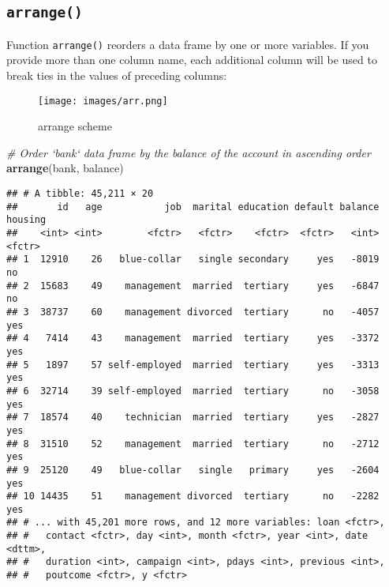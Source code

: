 \documentclass[]{book}
\newenvironment{Shaded}{\begin{snugshade}}{\end{snugshade}}
\newcommand{\KeywordTok}[1]{\textcolor[rgb]{0.13,0.29,0.53}{\textbf{{#1}}}}
\newcommand{\StringTok}[1]{\textcolor[rgb]{0.31,0.60,0.02}{{#1}}}
\newcommand{\CommentTok}[1]{\textcolor[rgb]{0.56,0.35,0.01}{\textit{{#1}}}}
\newcommand{\NormalTok}[1]{{#1}}
\begin{document}
\subsection{\texorpdfstring{\texttt{arrange()}}{arrange()}}\label{arrange}

Function \texttt{arrange()} reorders a data frame by one or more
variables. If you provide more than one column name, each additional
column will be used to break ties in the values of preceding columns:

\begin{figure}[htbp]
\centering
\texttt{[image: images/arr.png]}
\caption{arrange scheme}
\end{figure}

\begin{Shaded}
\begin{Highlighting}[]
\CommentTok{# Order `bank` data frame by the balance of the account in ascending order}
\KeywordTok{arrange}\NormalTok{(bank, balance)}
\end{Highlighting}
\end{Shaded}

\begin{verbatim}
## # A tibble: 45,211 × 20
##       id   age           job  marital education default balance housing
##    <int> <int>        <fctr>   <fctr>    <fctr>  <fctr>   <int>  <fctr>
## 1  12910    26   blue-collar   single secondary     yes   -8019      no
## 2  15683    49    management  married  tertiary     yes   -6847      no
## 3  38737    60    management divorced  tertiary      no   -4057     yes
## 4   7414    43    management  married  tertiary     yes   -3372     yes
## 5   1897    57 self-employed  married  tertiary     yes   -3313     yes
## 6  32714    39 self-employed  married  tertiary      no   -3058     yes
## 7  18574    40    technician  married  tertiary     yes   -2827     yes
## 8  31510    52    management  married  tertiary      no   -2712     yes
## 9  25120    49   blue-collar   single   primary     yes   -2604     yes
## 10 14435    51    management divorced  tertiary      no   -2282     yes
## # ... with 45,201 more rows, and 12 more variables: loan <fctr>,
## #   contact <fctr>, day <int>, month <fctr>, year <int>, date <dttm>,
## #   duration <int>, campaign <int>, pdays <int>, previous <int>,
## #   poutcome <fctr>, y <fctr>
\end{verbatim}

\begin{Shaded}
\end{Shaded}
\end{document}
